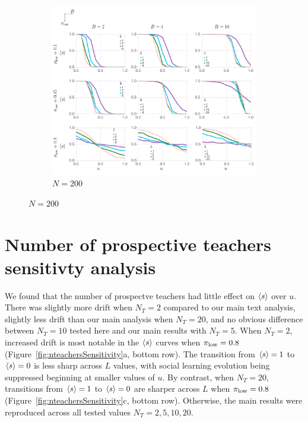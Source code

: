 \documentclass[letterpaper,11.5pt]{scrartcl}
\begin{document}
\begin{figure}
  \ContinuedFloat
	\begin{subfigure}{\textwidth}
	  \caption{$N=200$}
	  \includegraphics[width=\textwidth]{Figures/supplement/nagents=200/mainResultsPlots.pdf}
	\end{subfigure}
\end{figure}


\clearpage

\section{Number of prospective teachers sensitivty analysis}

We found that the number of prospectve teachers had little effect on $\langle s \rangle$
over $u$. There was slightly more drift when $N_T = 2$ compared to our 
main text analysis, slightly less drift than our main analysis when $N_T = 20$, 
and no obvious difference between $N_T = 10$ tested here and our main results
with $N_T = 5$. When $N_T = 2$, increased drift is most notable in the
$\langle s \rangle$ curves when $\pi_{\mathrm{low}}=0.8$ (Figure~\ref{fig:nteachersSensitivity}a, 
bottom row). The transition from $\langle s \rangle = 1$ to $\langle s \rangle = 0$ is less sharp
across $L$ values, with social learning evolution being suppressed beginning
at smaller values of $u$. By contrast, when $N_T = 20$, transitions from 
$\langle s \rangle = 1$ to $\langle s \rangle = 0$ are sharper across $L$ when $\pi_{\mathrm{low}} = 0.8$
(Figure~\ref{fig:nteachersSensitivity}c, bottom row). Otherwise, the main 
results were reproduced across all tested values $N_T=2,5,10,20$.
\end{document}
